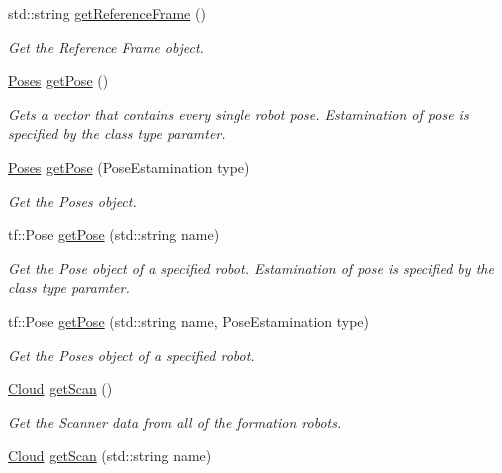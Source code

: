 \begin{DoxyCompactItemize}
std\+::string \hyperlink{classFormation_aee68539f4d3557c8de6ddc47b0930145}{get\+Reference\+Frame} ()
\begin{DoxyCompactList}\small\item\em Get the Reference Frame object. \end{DoxyCompactList}\item 
\hyperlink{classFormation_ae679dc0b3c837ce510678f0fd98baf36}{Poses} \hyperlink{classFormation_a17f1290727f4dbbb5cb465ed7e71157d}{get\+Pose} ()
\begin{DoxyCompactList}\small\item\em Gets a vector that contains every single robot pose. Estamination of pose is specified by the class type paramter. \end{DoxyCompactList}\item 
\hyperlink{classFormation_ae679dc0b3c837ce510678f0fd98baf36}{Poses} \hyperlink{classFormation_af1dc98ac112955531616fd2bbc8e623e}{get\+Pose} (Pose\+Estamination type)
\begin{DoxyCompactList}\small\item\em Get the Poses object. \end{DoxyCompactList}\item 
tf\+::\+Pose \hyperlink{classFormation_a2499e2f4187c728a877f1a1ba819e218}{get\+Pose} (std\+::string name)
\begin{DoxyCompactList}\small\item\em Get the Pose object of a specified robot. Estamination of pose is specified by the class type paramter. \end{DoxyCompactList}\item 
tf\+::\+Pose \hyperlink{classFormation_a29a211b4b563b671ff459e743220b4ca}{get\+Pose} (std\+::string name, Pose\+Estamination type)
\begin{DoxyCompactList}\small\item\em Get the Poses object of a specified robot. \end{DoxyCompactList}\item 
\hyperlink{classFormation_a35557939fd09f70d86432bfb68f315e2}{Cloud} \hyperlink{classFormation_ad14f504d5804ed58a4654ea876b3c200}{get\+Scan} ()
\begin{DoxyCompactList}\small\item\em Get the Scanner data from all of the formation robots. \end{DoxyCompactList}\item 
\hyperlink{classFormation_a35557939fd09f70d86432bfb68f315e2}{Cloud} \hyperlink{classFormation_a58d09fdb11d737bd50a5e6c77eaf5597}{get\+Scan} (std\+::string name)

\end{DoxyCompactItemize}
